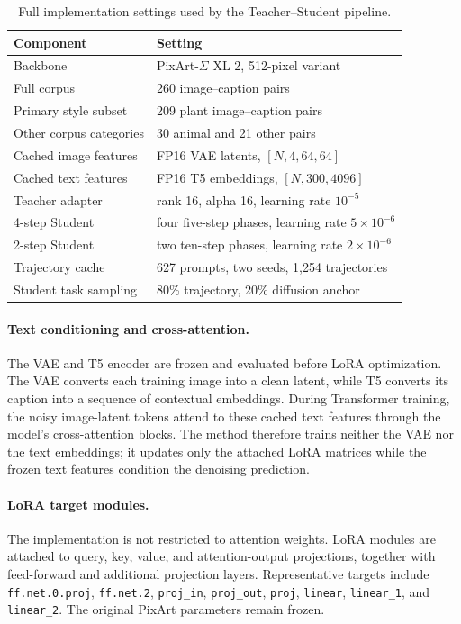 \documentclass{article}
\begin{document}
\begin{table}[h]
\centering
\small
\begin{tabular}{ll}
\toprule
\textbf{Component} & \textbf{Setting} \\
\midrule
Backbone & PixArt-$\Sigma$ XL 2, 512-pixel variant \\
Full corpus & 260 image--caption pairs \\
Primary style subset & 209 plant image--caption pairs \\
Other corpus categories & 30 animal and 21 other pairs \\
Cached image features & FP16 VAE latents, $[N,4,64,64]$ \\
Cached text features & FP16 T5 embeddings, $[N,300,4096]$ \\
Teacher adapter & rank 16, alpha 16, learning rate $10^{-5}$ \\
4-step Student & four five-step phases, learning rate $5\times10^{-6}$ \\
2-step Student & two ten-step phases, learning rate $2\times10^{-6}$ \\
Trajectory cache & 627 prompts, two seeds, 1,254 trajectories \\
Student task sampling & 80\% trajectory, 20\% diffusion anchor \\
\bottomrule
\end{tabular}
\caption{Full implementation settings used by the Teacher--Student pipeline.}
\label{tab:appendix-settings}
\end{table}

\paragraph{Text conditioning and cross-attention.}
The VAE and T5 encoder are frozen and evaluated before LoRA optimization. The
VAE converts each training image into a clean latent, while T5 converts its
caption into a sequence of contextual embeddings. During Transformer training,
the noisy image-latent tokens attend to these cached text features through the
model's cross-attention blocks. The method therefore trains neither the VAE nor
the text embeddings; it updates only the attached LoRA matrices while the
frozen text features condition the denoising prediction.

\paragraph{LoRA target modules.}
The implementation is not restricted to attention weights. LoRA modules are
attached to query, key, value, and attention-output projections, together with
feed-forward and additional projection layers. Representative targets include
\texttt{ff.net.0.proj}, \texttt{ff.net.2}, \texttt{proj\_in},
\texttt{proj\_out}, \texttt{proj}, \texttt{linear}, \texttt{linear\_1}, and
\texttt{linear\_2}. The original PixArt parameters remain frozen.
\end{document}
